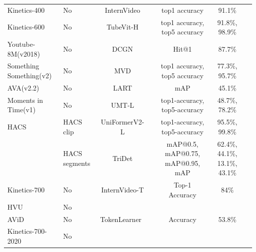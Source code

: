 \documentclass[a4paper]{article}
\begin{document}
\begin{table}
\begin{tabular}{l|l|c c c c c}
		Kinetics-400            & No            & InternVideo                   & \cite{InternVideo}   & top1 accuracy                                  & 91.1\%                                       \\
		Kinetics-600            & No            & TubeVit-H                     & \cite{TubeVit-H}     & top1 accuracy, top5 accuracy                   & 91.8\%, 98.9\%	                                     \\
		Youtube-8M(v2018)       & No            & DCGN                          & \cite{DCGN}          & Hit@1                                          & 87.7\%                                                     \\
		Something Something(v2) & No            & MVD                           & \cite{MVD}           & top1 accuracy, top5 accuracy                   & 77.3\%, 95.7\%            \\
		AVA(v2.2)               & No            & LART                          & \cite{LART}          & mAP                                            & 45.1\%          \\
		Moments in Time(v1)     & No            & UMT-L                         & \cite{UMT-L}         & top1-accuracy, top5-accuracy                   & 48.7\%, 78.2\%                                    \\
		HACS                    & HACS clip     & UniFormerV2-L                 & \cite{UniFormerV2-L} & top1-accuracy, top5-accuracy                   & 95.5\%, 99.8\%                                             \\
								& HACS segments & TriDet                        & \cite{TriDet}        & mAP@0.5, mAP@0.75, mAP@0.95, mAP               & 62.4\%, 44.1\%, 13.1\%, 43.1\%              \\
		Kinetics-700            & No            & InternVideo-T                 & \cite{InternVideo}   & Top-1 Accuracy                                 & 84\%                                              \\
		HVU                     & No            &                               &                      &                                                &                                                 \\
		AViD                    & No            & TokenLearner                  & \cite{TokenLearner}  & Accuracy                                       & 53.8\%                                              \\
		Kinetics-700-2020       & No            &                               &                      &                                                &                                                      \\

\end{tabular}
\end{table}
\end{document}
